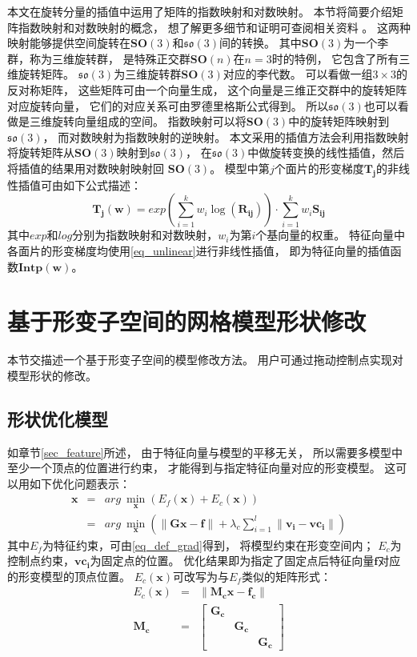本文在旋转分量的插值中运用了矩阵的指数映射和对数映射。
本节将简要介绍矩阵指数映射和对数映射的概念，
想了解更多细节和证明可查阅相关资料\cite{murray2017mathematical}
\cite{trove.nla.gov.au/work/222715717}。
这两种映射能够提供空间旋转在$\bm{SO}(3)$和$\mathfrak{so}(3)$间的转换。
其中$\bm{SO}(3)$为一个李群，称为三维旋转群，
是特殊正交群$\bm{SO}(n)$在$n=3$时的特例，
它包含了所有三维旋转矩阵。
$\mathfrak{so}(3)$为三维旋转群$\bm{SO}(3)$对应的李代数。
可以看做一组$3 \times 3$的反对称矩阵，
这些矩阵可由一个向量生成，
这个向量是三维正交群中的旋转矩阵对应旋转向量，
它们的对应关系可由罗德里格斯公式得到。
所以$\mathfrak{so}(3)$也可以看做是三维旋转向量组成的空间。
指数映射可以将$\bm{SO}(3)$中的旋转矩阵映射到$\mathfrak{so}(3)$，
而对数映射为指数映射的逆映射。
本文采用的插值方法会利用指数映射将旋转矩阵从$\bm{SO}(3)$映射到$\mathfrak{so}(3)$，
在$\mathfrak{so}(3)$中做旋转变换的线性插值，然后将插值的结果用对数映射映射回
$\bm{SO}(3)$。
模型中第$j$个面片的形变梯度$\bm{T_j}$的非线性插值可由如下公式描述：
\begin{equation}
    \label{eq_unlinear}
    \bm{T_j}(\bm{w})
    =
        exp(\sum_{i=1}^{k}w_i\log (\bm{R_{ij}}))
        \cdot
        \sum_{i=1}^{k}w_i\bm{S_{ij}}
\end{equation}
其中$exp$和$log$分别为指数映射和对数映射，$w_i$为第$i$个基向量的权重。
特征向量中各面片的形变梯度均使用\ref{eq_unlinear}进行非线性插值，
即为特征向量的插值函数$\bm{Intp}(\bm{w})$。
\section{基于形变子空间的网格模型形状修改}
本节交描述一个基于形变子空间的模型修改方法。
用户可通过拖动控制点实现对模型形状的修改。
\subsection{形状优化模型}
如章节\ref{sec_feature}所述，
由于特征向量与模型的平移无关，
所以需要多模型中至少一个顶点的位置进行约束，
才能得到与指定特征向量对应的形变模型。
这可以用如下优化问题表示：
\begin{eqnarray}
    \bm{x}&=&arg\ \min_{\bm{x}} (E_f(\bm{x}) + E_c(\bm{x})) \nonumber \\
          &=&arg\ \min_{\bm{x}} (\|\bm{Gx}-\bm{f}\| + \lambda_c  \sum_{i=1}^{l}\|\bm{v_i}-\bm{vc_i}\|)
\end{eqnarray}
其中$E_f$为特征约束，可由\ref{eq_def_grad}得到，
将模型约束在形变空间内；
$E_c$为控制点约束，$\bm{vc_i}$为固定点的位置。
优化结果即为指定了固定点后特征向量$\bm{f}$对应的形变模型的顶点位置。
$E_c(\bm{x})$可改写为与$E_f$类似的矩阵形式：
\begin{eqnarray}
    E_c(\bm{x})&=&\|\bm{
        \bm{M_c}x}
        -
        \bm{f_c}\| \nonumber \\
    \bm{M_c}&=&
    \begin{bmatrix}
        \bm{G_c} &        & \\ 
         &       \bm{G_c} & \\ 
         &       &        \bm{G_c}
    \end{bmatrix}
\end{eqnarray}

